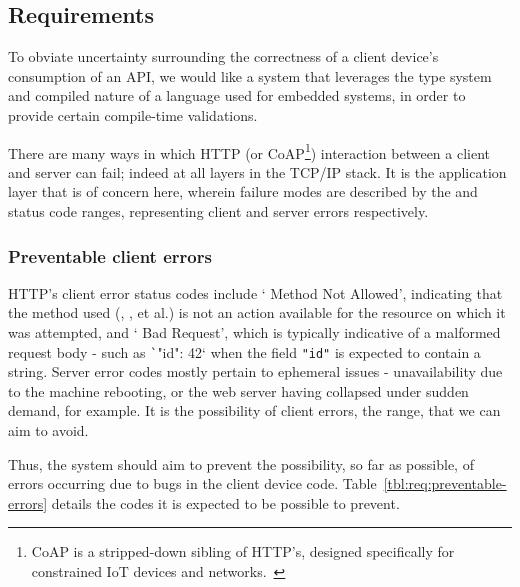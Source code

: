 \subsection{Requirements} \label{intro:req}

To obviate uncertainty surrounding the correctness of a client device's consumption of an API, we would like a system that leverages the type system and compiled nature of a language used for embedded systems, in order to provide certain compile-time validations.

There are many ways in which HTTP (or CoAP\footnote{CoAP is a stripped-down sibling of HTTP's, designed specifically for constrained IoT devices and networks.~\cite{rfc7252}}) interaction between a client and server can fail; indeed at all layers in the TCP/IP stack. It is the application layer that is of concern here, wherein failure modes are described by the  and  status code ranges, representing client and server errors respectively.

\subsubsection{Preventable client errors} \label{intro:req:preventable}
HTTP's client error status codes include ` Method Not Allowed', indicating that the method used (, , et al.) is not an action available for the resource on which it was attempted, and ` Bad Request', which is typically indicative of a malformed request body - such as \texttt`{"id": 42}` when the field \texttt{"id"} is expected to contain a string. Server error codes mostly pertain to ephemeral issues - unavailability due to the machine rebooting, or the web server having collapsed under sudden demand, for example. It is the possibility of client errors, the  range, that we can aim to avoid.

Thus, the system should aim to prevent the possibility, so far as possible, of errors occurring due to bugs in the client device code. Table~\cref{tbl:req:preventable-errors} details the codes it is expected to be possible to prevent.

